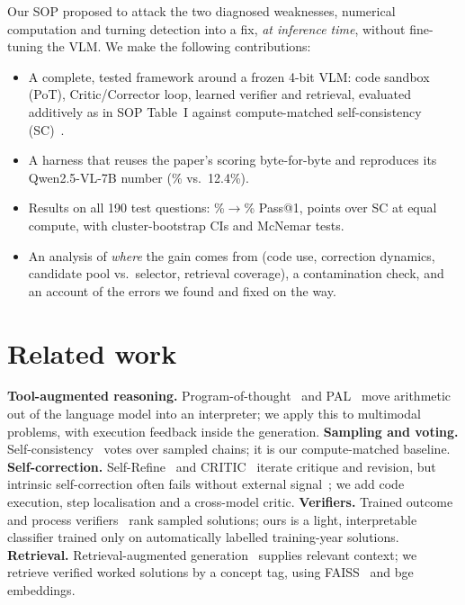 \documentclass[conference]{IEEEtran}
\begin{document}
Our SOP proposed to attack the two diagnosed weaknesses, numerical computation and turning
detection into a fix, \emph{at inference time}, without fine-tuning the VLM. We make the
following contributions:
\begin{itemize}
\item A complete, tested framework around a frozen 4-bit VLM: code sandbox (PoT), Critic/Corrector
loop, learned verifier and retrieval, evaluated additively as in SOP Table~I against
compute-matched self-consistency (SC)~\cite{selfconsistency}.
\item A harness that reuses the paper's scoring byte-for-byte and reproduces its Qwen2.5-VL-7B
number (\ReproAcc\% vs.\ 12.4\%).
\item Results on all 190 test questions: \BaseAcc\%$\to$\FullAcc\% Pass@1, \FullVsSc{} points
over SC at equal compute, with cluster-bootstrap CIs and McNemar tests.
\item An analysis of \emph{where} the gain comes from (code use, correction dynamics, candidate
pool vs.\ selector, retrieval coverage), a contamination check, and an account of the errors we
found and fixed on the way.
\end{itemize}

\section{Related work}
\textbf{Tool-augmented reasoning.} Program-of-thought~\cite{pot} and PAL~\cite{pal} move
arithmetic out of the language model into an interpreter; we apply this to multimodal problems,
with execution feedback inside the generation.
\textbf{Sampling and voting.} Self-consistency~\cite{selfconsistency} votes over sampled
chains; it is our compute-matched baseline.
\textbf{Self-correction.} Self-Refine~\cite{selfrefine} and CRITIC~\cite{critic} iterate
critique and revision, but intrinsic self-correction often fails without external
signal~\cite{cannotselfcorrect}; we add code execution, step localisation and a cross-model
critic.
\textbf{Verifiers.} Trained outcome and process verifiers~\cite{cobbe,lightman} rank sampled
solutions; ours is a light, interpretable classifier trained only on automatically labelled
training-year solutions.
\textbf{Retrieval.} Retrieval-augmented generation~\cite{rag} supplies relevant context; we
retrieve verified worked solutions by a concept tag, using FAISS~\cite{faiss} and
bge~\cite{bge} embeddings.
\end{document}
